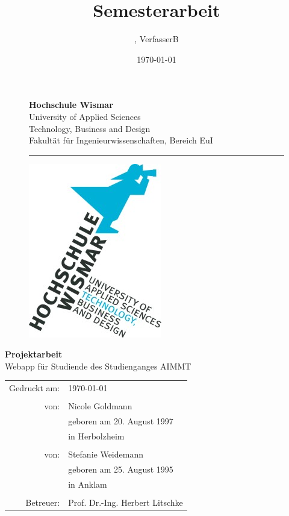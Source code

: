 \documentclass[12pt,					%
							 oneside,			%
							 a4paper,			%
							 halfparskip,		%
							 liststotoc,			%
							 bibtotoc,			%
							 fleqn,				%
							 pointlessnumbers]	%
							 {scrreprt}
\title{Semesterarbeit}
\author{\VerfasserA, VerfasserB}
\date{\today{}}
\newcommand{\VerfasserA}{Nicole Goldmann}
\newcommand{\GeburtstagA}{20. August 1997}
\newcommand{\GeburtsortA}{Herbolzheim}
\newcommand{\VerfasserB}{Stefanie Weidemann}
\newcommand{\GeburtstagB}{25. August 1995}
\newcommand{\GeburtsortB}{Anklam}
\newcommand{\Titel}{Webapp für Studiende des Studienganges AIMMT}
\newcommand{\Betreuer}{Prof. Dr.-Ing. Herbert Litschke}
\begin{document}

	\renewcommand\lstlistingname{Code}
	\renewcommand\lstlistlistingname{Codeverzeichnis}
	
	\begin{titlepage}
		\setlength\headsep{-5mm}
		\begin{figure}[!h]
			\begin{minipage}{0.8\textwidth}
				\textbf{Hochschule Wismar} \\
				University of Applied Sciences \\
				Technology, Business and Design \\
				Fakultät für Ingenieurwissenschaften, Bereich EuI \\
			\rule{\textwidth}{0.5pt}
			\end{minipage}
			\begin{minipage}[r]{0.1\textwidth}
				\begin{flushright}
					\includegraphics[height=6\baselineskip]{pictures/HS-Wismar_Logo-FIW_2010-01.jpg}
				\end{flushright}
			\end{minipage}
		\end{figure}
		\vspace*{6cm}
		\begin{center}
			\Huge
			\textbf{Projektarbeit} \\
			\vspace{2cm}
			\large \Titel
			\begin{table}[b]
				\begin{tabular}{rl}
					Gedruckt am: & \today \\
					\\
					von: & \VerfasserA \\
					& geboren am \GeburtstagA \\
					& in \GeburtsortA \\
					\\
					von: & \VerfasserB \\
					& geboren am \GeburtstagB \\
					& in \GeburtsortB \\
					\\
					Betreuer: & \Betreuer \\

				\end{tabular}
			\end{table}
		\end{center}
	\end{titlepage}
\end{document}
